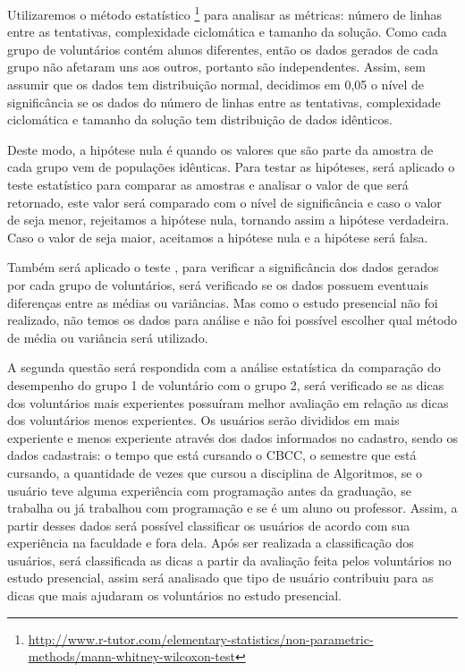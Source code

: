 Utilizaremos o método estatístico \footnote{\url{http://www.r-tutor.com/elementary-statistics/non-parametric-methods/mann-whitney-wilcoxon-test}} para analisar as métricas: número de linhas entre as tentativas, complexidade ciclomática e tamanho da solução. Como cada grupo de voluntários contém alunos diferentes, então os dados gerados de cada grupo não afetaram uns aos outros, portanto são independentes. Assim, sem assumir que os dados tem distribuição normal, decidimos em 0,05 o nível de significância se os dados do número de linhas entre as tentativas, complexidade ciclomática e tamanho da solução tem distribuição de dados idênticos. 

Deste modo, a hipótese nula é quando os valores que são parte da amostra de cada grupo vem de populações idênticas. Para testar as hipóteses, será aplicado o teste estatístico para comparar as amostras e analisar o valor de  que será retornado, este valor será comparado com o nível de significância e caso o valor de  seja menor, rejeitamos a hipótese nula, tornando assim a hipótese verdadeira. Caso o valor de  seja maior, aceitamos a hipótese nula e a hipótese será falsa. 

Também será aplicado o teste  \cite{macbeth2011cliff}, para verificar a significância dos dados gerados por cada grupo de voluntários, será verificado se os dados possuem eventuais diferenças entre as médias ou variâncias. Mas como o estudo presencial não foi realizado, não temos os dados para análise e não foi possível escolher qual método de média ou variância será utilizado.

A segunda questão será respondida com a análise estatística da comparação do desempenho do grupo 1 de voluntário com o grupo 2, será verificado se as dicas dos voluntários mais experientes possuíram melhor avaliação em relação as dicas dos voluntários menos experientes. Os usuários serão divididos em mais experiente e menos experiente através dos dados informados no cadastro, sendo os dados cadastrais: o tempo que está cursando o CBCC, o semestre que está cursando, a quantidade de vezes que cursou a disciplina de Algoritmos, se o usuário teve alguma experiência com programação antes da graduação, se trabalha ou já trabalhou com programação e se é um aluno ou professor. Assim, a partir desses dados será possível classificar os usuários de acordo com sua experiência na faculdade e fora dela. Após ser realizada a classificação dos usuários, será classificada as dicas a partir da avaliação feita pelos voluntários no estudo presencial, assim será analisado que tipo de usuário contribuiu para as dicas que mais ajudaram os voluntários no estudo presencial.

